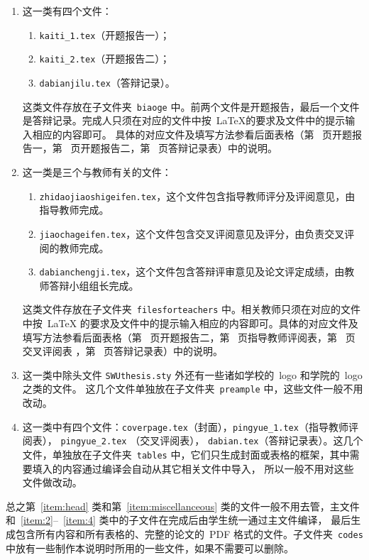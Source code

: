 \begin{enumerate}
  \item 这一类有四个文件：
  \begin{enumerate}
    \item {\tt kaiti\_1.tex}（开题报告一）；
    \item {\tt kaiti\_2.tex}（开题报告二）；
    \item {\tt dabianjilu.tex}（答辩记录）。
  \end{enumerate}
   这类文件存放在子文件夹~{\tt biaoge} 中。前两个文件是开题报告，最后一个文件是答辩记录。完成人只须在对应的文件中按~\LaTeX 的要求及文件中的提示输入相应的内容即可。
   具体的对应文件及填写方法参看后面表格（第~\pageref{table:kaiti_1} 页开题报告一，第~\pageref{table:kaiti_2} 页开题报告二，第~\pageref{table:dabianjilu} 页答辩记录表）中的说明。
  \item\label{item:4} 这一类是三个与教师有关的文件：
  \begin{enumerate}
    \item\label{term1} {\tt zhidaojiaoshigeifen.tex}，这个文件包含指导教师评分及评阅意见，由指导教师完成。
    \item {\tt jiaochageifen.tex}，这个文件包含交叉评阅意见及评分，由负责交叉评阅的教师完成。
    \item {\tt dabianchengji.tex}，这个文件包含答辩评审意见及论文评定成绩，由教师答辩小组组长完成。
  \end{enumerate}
  这类文件存放在子文件夹~{\tt filesforteachers} 中。相关教师只须在对应的文件中按~\LaTeX
  的要求及文件中的提示输入相应的内容即可。具体的对应文件及填写方法参看后面表格（第~\pageref{table:kaiti_2} 页开题报告二，第~\pageref{table:pingyue} 页指导教师评阅表，第~\pageref{table:jiaochapingyue} 页交叉评阅表
  ，第~\pageref{table:dabianjilu} 页答辩记录表）中的说明。
  \item\label{item:head} 这一类中除头文件{ \tt SWUthesis.sty} 外还有一些诸如学校的~logo 和学院的~logo 之类的文件。
        这几个文件单独放在子文件夹~{\tt preample} 中，这些文件一般不用改动。

  \item\label{item:miscellanceous} 这一类中有四个文件：{\tt coverpage.tex}（封面），{\tt pingyue\_1.tex}（指导教师评阅表）， {\tt pingyue\_2.tex} （交叉评阅表），
        {\tt dabian.tex}（答辩记录表）。这几个文件，单独放在子文件夹~{\tt tables} 中，它们只生成封面或表格的框架，其中需要填入的内容通过编译会自动从其它相关文件中导入，
        所以一般不用对这些文件做改动。
\end{enumerate}
总之第~\ref{item:head} 类和第~\ref{item:miscellanceous} 类的文件一般不用去管，主文件和~\ref{item:2}--~\ref{item:4} 类中的子文件在完成后由学生统一通过主文件编译，
最后生成包含所有内容和所有表格的、完整的论文的~PDF 格式的文件。子文件夹~{\tt codes} 中放有一些制作本说明时所用的一些文件，如果不需要可以删除。
